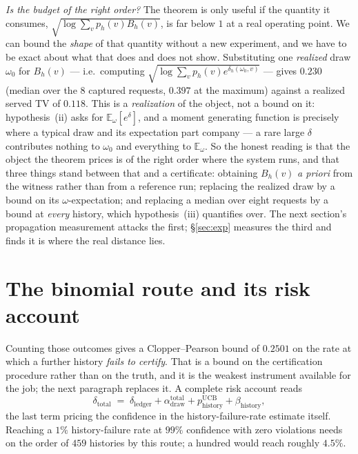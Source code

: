 \documentclass[11pt]{article}
\renewcommand{\_}{\WCorigunderscore\allowbreak}
\begin{document}
\emph{Is the budget of the right order?} The theorem is only useful if
the quantity it consumes, $\sqrt{\log\sum_v p_h(v)B_h(v)}$, is far below
$1$ at a real operating point. We can bound the \emph{shape} of that
quantity without a new experiment, and we have to be exact about what
that does and does not show. Substituting one \emph{realized} draw
$\omega_0$ for $B_h(v)$ --- i.e.\ computing
$\sqrt{\log\sum_v p_h(v)e^{\delta_h(\omega_0,v)}}$ --- gives $0.230$
(median over the $8$ captured requests, $0.397$ at the maximum) against a
realized served TV of $0.118$. This is a \emph{realization} of the
object, not a bound on it: hypothesis~(ii) asks for
$\mathbb{E}_\omega[e^{\delta}]$, and a moment generating function is
precisely where a typical draw and its expectation part company --- a
rare large $\delta$ contributes nothing to $\omega_0$ and everything to
$\mathbb{E}_\omega$. So the honest reading is that the object the
theorem prices is of the right order where the system runs, and that
three things stand between that and a certificate: obtaining $B_h(v)$
\emph{a priori} from the witness rather than from a reference run;
replacing the realized draw by a bound on its $\omega$-expectation; and
replacing a median over eight requests by a bound at \emph{every}
history, which hypothesis~(iii) quantifies over. The next section's
propagation measurement attacks the first; \S\ref{sec:exp}
measures the third and finds it is where the real distance lies.


\section{The binomial route and its risk account}
\label{app:cprisk}

Counting those outcomes gives a Clopper--Pearson bound of $0.2501$ on the
rate at which a further history \emph{fails to certify}. That is a bound
on the certification procedure rather than on the truth, and it is the
weakest instrument available for the job; the next paragraph replaces it.
A complete risk account reads
\begin{equation}\label{eq:risk}
  \delta_{\mathrm{total}}\;=\;\delta_{\mathrm{ledger}}
  +\alpha_{\mathrm{draw}}^{\mathrm{total}}
  +p_{\mathrm{history}}^{\mathrm{UCB}}
  +\beta_{\mathrm{history}},
\end{equation}
the last term pricing the confidence in the history-failure-rate estimate
itself. Reaching a $1\%$
history-failure rate at $99\%$ confidence with zero violations needs on
the order of $459$ histories by this route; a hundred would reach roughly
$4.5\%$.
\end{document}
